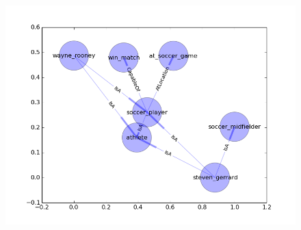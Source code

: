 \documentclass[a4paper,12pt]{article}
\begin{document}
\begin{figure}[h]
 \centering
 \includegraphics[width=10 cm]{./figure_1.png}
\end{figure}





 
\end{document}
